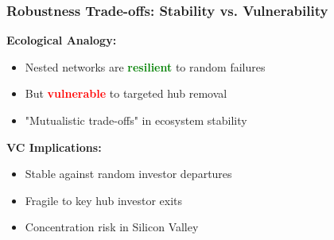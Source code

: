 \begin{frame}
\frametitle{Robustness Trade-offs: Stability vs. Vulnerability}

\textbf{Ecological Analogy:}
\begin{itemize}
    \item Nested networks are \textcolor{green}{\textbf{resilient}} to random failures
    \item But \textcolor{red}{\textbf{vulnerable}} to targeted hub removal
    \item "Mutualistic trade-offs" in ecosystem stability
\end{itemize}

\vspace{0.3cm}

\textbf{VC Implications:}
\begin{itemize}
    \item Stable against random investor departures
    \item Fragile to key hub investor exits
    \item Concentration risk in Silicon Valley
\end{itemize}
\end{frame}





